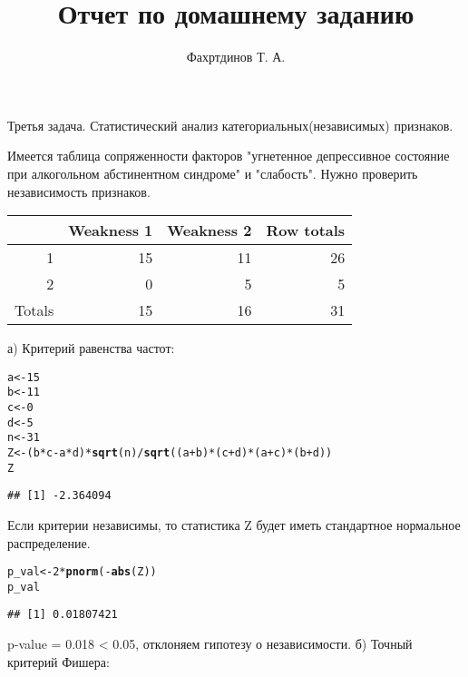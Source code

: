 \documentclass{article}\usepackage[]{graphicx}\usepackage[]{color}
\makeatletter
\newcommand{\hlnum}[1]{\textcolor[rgb]{0.686,0.059,0.569}{#1}}%
\newcommand{\hlopt}[1]{\textcolor[rgb]{0,0,0}{#1}}%
\newcommand{\hlstd}[1]{\textcolor[rgb]{0.345,0.345,0.345}{#1}}%
\newcommand{\hlkwb}[1]{\textcolor[rgb]{0.69,0.353,0.396}{#1}}%
\newcommand{\hlkwd}[1]{\textcolor[rgb]{0.737,0.353,0.396}{\textbf{#1}}}%
\newenvironment{kframe}{%
 \def\at@end@of@kframe{}%
 \ifinner\ifhmode%
  \def\at@end@of@kframe{\end{minipage}}%
  \begin{minipage}{\columnwidth}%
 \fi\fi%
 \def\FrameCommand##1{\hskip\@totalleftmargin \hskip-\fboxsep
 \colorbox{shadecolor}{##1}\hskip-\fboxsep
     \hskip-\linewidth \hskip-\@totalleftmargin \hskip\columnwidth}%
 \MakeFramed {\advance\hsize-\width
   \@totalleftmargin\z@ \linewidth\hsize
   \@setminipage}}%
 {\par\unskip\endMakeFramed%
 \at@end@of@kframe}
\newenvironment{knitrout}{}{} %
\makeatother
\begin{document}
\title{Отчет по домашнему заданию}
\pretitle{\vspace{\droptitle}\centering\huge}
\posttitle{\par}
\author{Фахртдинов Т. А.}


\maketitle
Третья задача. Статистический анализ категориальных(независимых) признаков.

Имеется таблица сопряженности факторов "угнетенное депрессивное состояние при алкогольном  абстинентном синдроме" и "слабость". Нужно проверить независимость признаков.
\begin{center}
    \begin{tabular}{|r|r|r|r|} \hline
           & Weakness 1 & Weakness 2 & Row totals\\ \hline
         1 & 15 & 11 & 26\\ \hline
         2 & 0 & 5 & 5 \\ \hline
         Totals & 15 & 16 & 31 \\ \hline
         
    \end{tabular}
\end{center}

а) Критерий равенства частот:


\begin{knitrout}
\color{fgcolor}\begin{kframe}
\begin{alltt}
\hlstd{a} \hlkwb{<-} \hlnum{15}
\hlstd{b} \hlkwb{<-} \hlnum{11}
\hlstd{c} \hlkwb{<-} \hlnum{0}
\hlstd{d} \hlkwb{<-} \hlnum{5}
\hlstd{n} \hlkwb{<-} \hlnum{31}
\hlstd{Z} \hlkwb{<-} \hlstd{(b}\hlopt{*}\hlstd{c} \hlopt{-} \hlstd{a}\hlopt{*}\hlstd{d)}\hlopt{*}\hlkwd{sqrt}\hlstd{(n)} \hlopt{/} \hlkwd{sqrt}\hlstd{((a} \hlopt{+} \hlstd{b)}\hlopt{*}\hlstd{(c} \hlopt{+} \hlstd{d)}\hlopt{*}\hlstd{(a} \hlopt{+} \hlstd{c)}\hlopt{*}\hlstd{(b} \hlopt{+} \hlstd{d))}
\hlstd{Z}
\end{alltt}
\begin{verbatim}
## [1] -2.364094
\end{verbatim}
\end{kframe}
\end{knitrout}
Если критерии независимы, то статистика Z будет иметь стандартное нормальное распределение.
\begin{knitrout}
\color{fgcolor}\begin{kframe}
\begin{alltt}
\hlstd{p_val} \hlkwb{<-} \hlnum{2} \hlopt{*} \hlkwd{pnorm}\hlstd{(}\hlopt{-}\hlkwd{abs}\hlstd{(Z))}
\hlstd{p_val}
\end{alltt}
\begin{verbatim}
## [1] 0.01807421
\end{verbatim}
\end{kframe}
\end{knitrout}
p-value = 0.018 < 0.05, отклоняем гипотезу о независимости.
\newpage
б) Точный критерий Фишера: 
\end{document}
